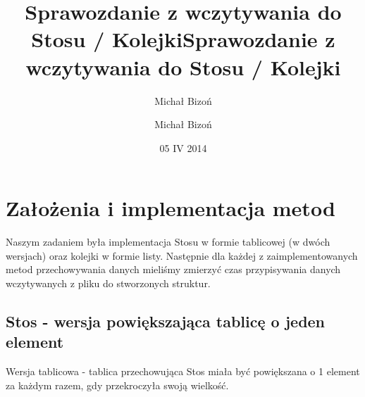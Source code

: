 \documentclass[12pt,a4paper,oneside]{article}
\author{Michał Bizoń}
\title{Sprawozdanie z wczytywania do Stosu / Kolejki}
\begin{document}
\title{Sprawozdanie z wczytywania do Stosu / Kolejki}
\author{Michał Bizoń}
\date{05 IV 2014}
\maketitle

\section{Założenia i implementacja metod}
Naszym zadaniem była implementacja Stosu w formie tablicowej (w dwóch wersjach) oraz kolejki w formie listy. Następnie dla każdej z zaimplementowanych metod przechowywania danych mieliśmy zmierzyć czas przypisywania danych wczytywanych z pliku do stworzonych struktur.

\subsection{Stos - wersja powiększająca tablicę o jeden element}
Wersja tablicowa - tablica przechowująca Stos miała być powiększana o 1 element za każdym razem, gdy przekroczyła swoją wielkość.
\end{document}
